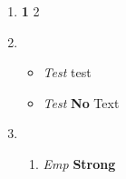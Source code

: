 \documentclass{article}
\begin{document}
\begin{enumerate}\item \textbf{1 }2\item \begin{itemize}\item \emph{Test }test\item \emph{Test }\textbf{No }Text\end{itemize}\item \begin{enumerate}\item \emph{Emp }\textbf{Strong}\end{enumerate}\end{enumerate}
\end{document}
